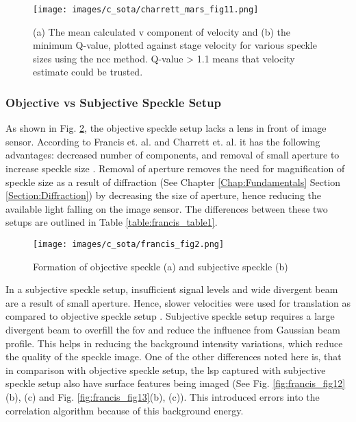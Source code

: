    
    \begin{figure}[h]
        \centering
        \texttt{[image: images/c\_sota/charrett\_mars\_fig11.png]}
        \caption{(a) The mean calculated v component of velocity and (b) the minimum Q-value, plotted against stage velocity for various speckle sizes using the \gls{ncc} method. Q-value > 1.1 means that velocity estimate could be trusted. \cite{charrett_mars}}
        \label{fig:charrett_mars_fig11}
    \end{figure}

    \subsubsection*{Objective vs Subjective Speckle Setup}\label{Subsubsection:Objective_Subjective}

    As shown in Fig. \ref{fig:francis_fig2}, the objective speckle setup lacks a lens in front of image sensor. According to Francis et. al. and Charrett et. al. it has the following advantages: decreased number of components, and removal of small aperture to increase speckle size \cite{francis_autonomous} \cite{charrett_2018}. Removal of aperture removes the need for magnification of speckle size as a result of diffraction (See Chapter \ref{Chap:Fundamentals} Section \ref{Section:Diffraction}) by decreasing the size of aperture, hence reducing the available light falling on the image sensor. The differences between these two setups are outlined in Table \ref{table:francis_table1}.

    \begin{figure}[h]
        \centering
        \texttt{[image: images/c\_sota/francis\_fig2.png]}
        \caption{Formation of objective speckle (a) and subjective speckle (b) \cite{francis_autonomous}}
        \label{fig:francis_fig2}
    \end{figure}

    \noindent In a subjective speckle setup, insufficient signal levels and wide divergent beam are a result of small aperture. Hence, slower velocities were used for translation as compared to objective speckle setup \cite{francis_autonomous}. Subjective speckle setup requires a large divergent beam to overfill the \gls{fov} and reduce the influence from Gaussian beam profile. This helps in reducing the background intensity variations, which reduce the quality of the speckle image. One of the other differences noted here is, that in comparison with objective speckle setup, the \gls{lsp} captured with subjective speckle setup also have surface features being imaged (See Fig. \ref{fig:francis_fig12}(b), (c) and Fig. \ref{fig:francis_fig13}(b), (c)). This introduced errors into the correlation algorithm because of this background energy.

